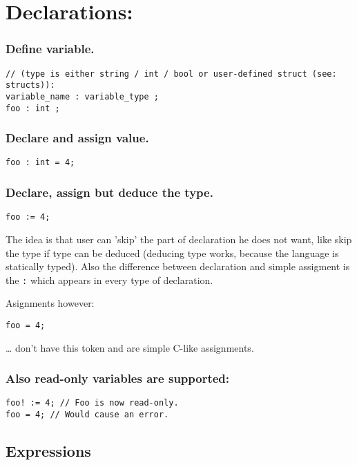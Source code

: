 \documentclass[11pt]{article}
\begin{document}
\section*{Declarations:}
\label{sec:org2de0dde}

\subsubsection*{Define variable.}
\label{sec:org5e48516}
\begin{verbatim}
// (type is either string / int / bool or user-defined struct (see: structs)):
variable_name : variable_type ;
foo : int ;
\end{verbatim}

\subsubsection*{Declare and assign value.}
\label{sec:orgdd5d911}
\begin{verbatim}
foo : int = 4;
\end{verbatim}

\subsubsection*{Declare, assign but deduce the type.}
\label{sec:org1d5c58f}
\begin{verbatim}
foo := 4;
\end{verbatim}

The idea is that user can 'skip' the part of declaration he does not want, like
skip the type if type can be deduced (deducing type works, because the language
is statically typed). Also the difference between declaration and simple
assigment is the \texttt{:} which appears in every type of declaration.

Asignments however:
\begin{verbatim}
foo = 4;
\end{verbatim}
\ldots{} don't have this token and are simple C-like assignments.

\subsubsection*{Also read-only variables are supported:}
\label{sec:org0f96fda}
\begin{verbatim}
foo! := 4; // Foo is now read-only.
foo = 4; // Would cause an error.
\end{verbatim}


\subsection*{Expressions}
\label{sec:org7379ec7}
\end{document}

